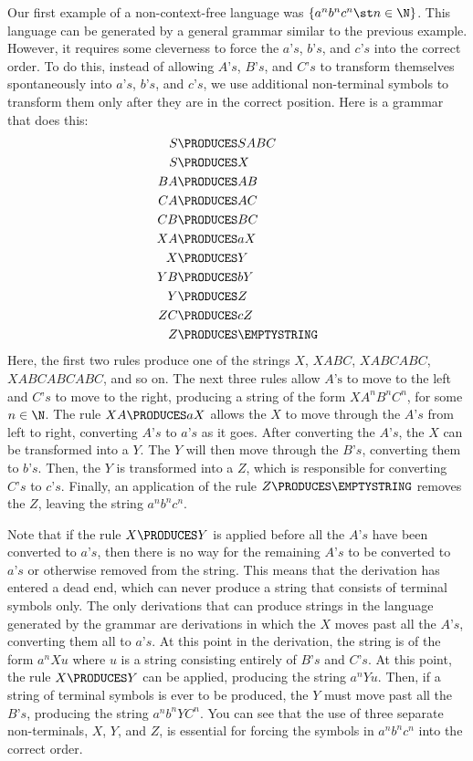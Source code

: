 Our first example of a non-context-free language was $\{a^nb^nc^n\st n\in \N\}$.
This language can be generated by a general grammar similar to the previous
example.  However, it requires some cleverness to force the $a\text{'}s$,
$b\text{'}s$, and $c\text{'}s$ into the correct order.  To do this, instead of
allowing $A\text{'}s$, $B\text{'}s$, and $C\text{'}s$ to transform themselves
spontaneously into $a\text{'}s$, $b\text{'}s$, and $c\text{'}s$, we use additional
non-terminal symbols to transform them only after they are in the correct position.
Here is a grammar that does this:
\begin{align*}
  S&\PRODUCES SABC\\
  S&\PRODUCES X\\
  BA&\PRODUCES AB\\
  CA&\PRODUCES AC\\
  CB&\PRODUCES BC\\
  XA&\PRODUCES aX\\
  X&\PRODUCES Y\\
  YB&\PRODUCES bY\\
  Y&\PRODUCES Z\\
  ZC&\PRODUCES cZ\\
  Z&\PRODUCES \EMPTYSTRING
\end{align*}
Here, the first two rules produce one of the strings $X$, $XABC$, $XABCABC$,
$XABCABCABC$, and so on.  The next three rules allow $A\text{'s}$ to move to the
left and $C\text{'}s$ to move to the right, producing a string of the form $XA^nB^nC^n$,
for some $n\in\N$.  The rule $XA\PRODUCES aX$ allows the
$X$ to move through the $A\text{'}s$ from left to right, converting $A\text{'}s$
to $a\text{'}s$ as it goes.  After converting the $A\text{'}s$, the $X$ can be
transformed into a $Y$.  The $Y$ will then move through the $B\text{'}s$, converting
them to $b\text{'}s$.  Then, the $Y$ is transformed into a $Z$, which is responsible
for converting $C\text{'}s$ to $c\text{'}s$.  Finally, an application of the
rule $Z\PRODUCES\EMPTYSTRING$ removes the $Z$, leaving the string $a^nb^nc^n$.

Note that if the rule $X\PRODUCES Y$ is applied before all the $A\text{'}s$ have
been converted to $a\text{'}s$, then there is no way for the remaining $A\text{'}s$
to be converted to $a\text{'}s$ or otherwise removed from the string.  This means
that the derivation has entered a dead end, which can never produce a string
that consists of terminal symbols only.  The only derivations that can produce
strings in the language generated by the grammar are derivations in which the
$X$ moves past all the $A\text{'}s$, converting them all to $a\text{'}s$.  At this
point in the derivation, the string is of the form $a^nXu$ where $u$ is a string
consisting entirely of $B\text{'}s$ and $C\text{'}s$.  At this point, the
rule $X\PRODUCES Y$ can be applied, producing the string $a^nYu$.  Then, if a string
of terminal symbols is ever to be produced, the $Y$ must move past all the $B\text{'}s$,
producing the string $a^nb^nYC^n$.  You can see that the use of three separate
non-terminals, $X$, $Y$, and $Z$, is essential for forcing the symbols in
$a^nb^nc^n$ into the correct order.

